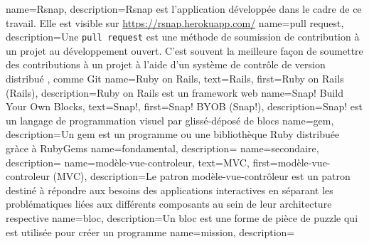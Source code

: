 

{
 name=Rsnap,
 description={Rsnap \cite{rsnap} est l'application développée dans le cadre de ce travail. Elle est visible sur \url{https://rsnap.herokuapp.com/}}
}
{
 name={pull request},
 description={Une \texttt{pull request} est une méthode de soumission de contribution à un projet au développement ouvert. C'est  souvent la meilleure façon de soumettre des contributions à un projet à l'aide d'un système de contrôle de version distribué , comme Git}
}
{
 name={Ruby on Rails},
 text={Rails},
 first={Ruby on Rails (Rails)},
 description={Ruby on Rails \cite{rails} est un framework web}
}
{
 name={Snap! Build Your Own Blocks},
 text={Snap!},
 first={Snap! BYOB (Snap!)},
 description={Snap! \cite{snap} est un langage de programmation visuel par glissé-déposé de \glspl{bloc}}
}
{
 name={gem},
 description={Un gem \cite{gem} est un programme ou une bibliothèque Ruby distribuée gràce à RubyGems}
}
{
 name={fondamental},
 description={}
}
{
 name={secondaire},
 description={}
}
{
 name={modèle-vue-controleur},
 text={MVC},
 first={modèle-vue-controleur (MVC)},
 description={Le patron modèle-vue-contrôleur \cite{wiki-mvc} est un patron destiné à répondre aux besoins des applications interactives en séparant les problématiques liées aux différents composants au sein de leur architecture respective}
}
{
 name={bloc},
 description={Un bloc est une forme de pièce de puzzle qui est utilisée pour créer un programme} %
}
{
 name={mission},
 description={}
}

